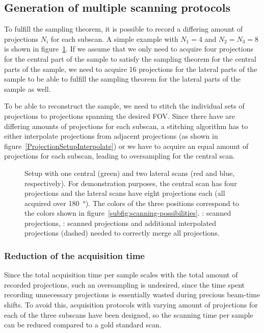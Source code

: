 \subsection{Generation of multiple scanning protocols}
\cbstart
To fulfill the sampling theorem, it is possible to record a differing amount of projections $N_{i}$ for each subscan. A simple example with $N_{1}=4$ and $N_{2}=N_{3}=8$ is shown in figure~\ref{fig:projections}. If we assume that we only need to acquire four projections for the central part of the sample to satisfy the sampling theorem for the central parts of the sample, we need to acquire 16 projections for the lateral parts of the sample to be able to fulfill the sampling theorem for the lateral parts of the sample as well.

To be able to reconstruct the sample, we need to stitch the individual sets of projections to projections spanning the desired FOV. Since there have are differing amounts of projections for each subscan, a stitching algorithm has to either interpolate projections from adjacent projections (as shown in figure~\ref{ProjectionSetupInterpolate}) or we have to acquire an equal amount of projections for each subscan, leading to oversampling for the central scan.

\begin{figure}[htp]
	\centering
	\subfloat[]{%
		\label{subfig:ProjectionSetup}%
		}%
	\subfloat[]{%
		\label{subfig:ProjectionSetupInterpolate}%
		}%
	\caption{Setup with one central (green) and two lateral scans (red and blue, respectively). For demonstration purposes, the central scan has four projections and the lateral scans have eight projections each (all acquired over \SI{180}{\degree}). The colors of the three positions correspond to the colors shown in figure~\ref{subfig:scanning-possibilities}. : scanned projections, : scanned projections and additional interpolated projections (dashed) needed to correctly merge all projections.}
	\label{fig:projections}
\end{figure}
\cbend

\subsubsection{Reduction of the acquisition time}
\cbstart
Since the total acquisition time per sample scales with the total amount of recorded projections, such an oversampling is undesired, since the time spent recording unnecessary projections is essentially wasted during precious beam-time shifts. To avoid this, acquisition protocols with varying amount of projections for each of the three subscans have been designed, so the scanning time per sample can be reduced compared to a gold standard scan.

